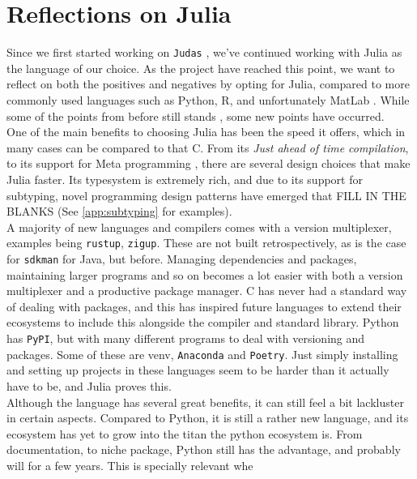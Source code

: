 \section*{Reflections on Julia}
\label{sec:juliaref}

Since we first started working on \texttt{Judas} \cite{projthesis}, we've continued working with Julia as the language of our choice. As the project have reached this point, we want to reflect on both the positives and negatives by opting for Julia, compared to more commonly used languages such as Python, R, and unfortunately MatLab \cite{matlabpyr}. While some of the points from before still stands \cite{projthesis}, some new points have occurred. \\

One of the main benefits to choosing Julia has been the speed it offers, which in many cases can be compared to that C. From its \textit{Just ahead of time compilation}, to its support for Meta programming \cite{whyjulia} \cite{julia}, there are several design choices that make Julia faster. Its typesystem is extremely rich, and due to its support for subtyping, novel programming design patterns have emerged that FILL IN THE BLANKS (See \ref{app:subtyping} for examples). \\ 

A majority of new languages and compilers comes with a version multiplexer, examples being \texttt{rustup}, \texttt{zigup}. These are not built retrospectively, as is the case for \texttt{sdkman} for Java, but before. Managing dependencies and packages, maintaining larger programs and so on becomes a lot easier with both a version multiplexer and a productive package manager. C has never had a standard way of dealing with packages, and this has inspired future languages to extend their ecosystems to include this alongside the compiler and standard library. Python has \texttt{PyPI}, but with many different programs to deal with versioning and packages. Some of these are venv, \texttt{Anaconda} and \texttt{Poetry}. Just simply installing and setting up projects in these languages seem to be harder than it actually have to be, and Julia proves this. \\ 


Although the language has several great benefits, it can still feel a bit lackluster in certain aspects. Compared to Python, it is still a rather new language, and its ecosystem has yet to grow into the titan the python ecosystem is. From documentation, to niche package, Python still has the advantage, and probably will for a few years. This is specially relevant whe




